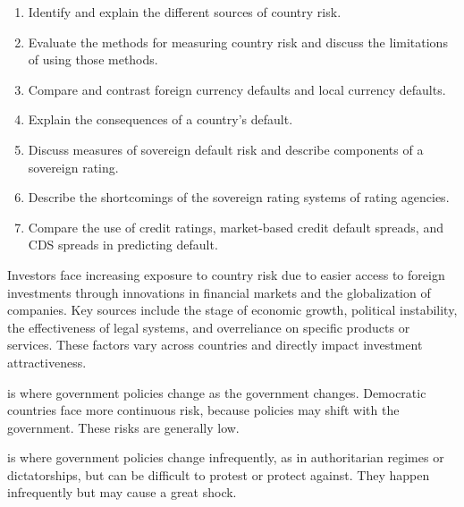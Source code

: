 
\begin{crkeybox}
\begin{enumerate}[label=\textbf{\alph*.},leftmargin=2em]
\item Identify and explain the different sources of country risk.
\item Evaluate the methods for measuring country risk and discuss the limitations of using those methods.
\item Compare and contrast foreign currency defaults and local currency defaults.
\item Explain the consequences of a country's default.
\item Discuss measures of sovereign default risk and describe components of a sovereign rating.
\item Describe the shortcomings of the sovereign rating systems of rating agencies.
\item Compare the use of credit ratings, market-based credit default spreads, and CDS spreads in predicting default.
\end{enumerate}
\end{crkeybox}


Investors face increasing exposure to country risk due to easier access to
foreign investments through innovations in financial markets and the
globalization of companies. Key sources include the stage of economic growth,
political instability, the effectiveness of legal systems, and overreliance on
specific products or services. These factors vary across countries and directly
impact investment attractiveness.

\begin{crdefbox}
 is where government policies change as the government
changes. Democratic countries face more continuous risk, because policies may
shift with the government. These risks are generally low.

\smallskip
{} is where government policies change infrequently, as in
authoritarian regimes or dictatorships, but can be difficult to protest or
protect against. They happen infrequently but may cause a great shock.
\end{crdefbox}


